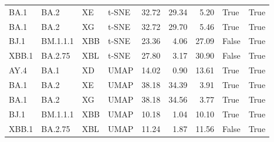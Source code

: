 \begin{tabular}{llllrrrll}
      BA.1 &       BA.2 &            XE &  t-SNE &         32.72 &         29.34 &          5.20 &                             True &                           True \\
      BA.1 &       BA.2 &            XG &  t-SNE &         32.72 &         29.70 &          5.46 &                             True &                           True \\
      BJ.1 &   BM.1.1.1 &           XBB &  t-SNE &         23.36 &          4.06 &         27.09 &                            False &                           True \\
     XBB.1 &    BA.2.75 &           XBL &  t-SNE &         27.80 &          3.17 &         30.90 &                            False &                           True \\
      AY.4 &       BA.1 &            XD &   UMAP &         14.02 &          0.90 &         13.61 &                             True &                           True \\
      BA.1 &       BA.2 &            XE &   UMAP &         38.18 &         34.39 &          3.91 &                             True &                           True \\
      BA.1 &       BA.2 &            XG &   UMAP &         38.18 &         34.56 &          3.77 &                             True &                           True \\
      BJ.1 &   BM.1.1.1 &           XBB &   UMAP &         10.18 &          1.04 &         10.10 &                             True &                           True \\
     XBB.1 &    BA.2.75 &           XBL &   UMAP &         11.24 &          1.87 &         11.56 &                            False &                           True \\
\bottomrule
\end{tabular}
